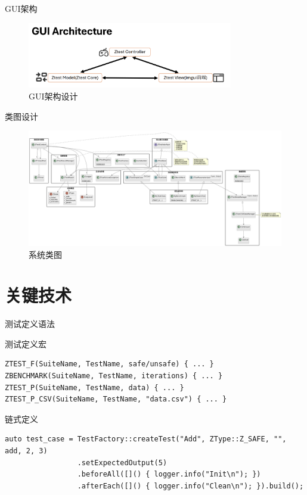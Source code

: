 \documentclass{beamer}
\begin{document}
\begin{frame}{GUI架构}
    \begin{figure}
        \centering
        \includegraphics[width=0.8\textwidth]{img/guiarch.png}
        \caption{GUI架构设计}
    \end{figure}
\end{frame}

\begin{frame}{类图设计}
    \begin{figure}
        \centering
        \includegraphics[width=\textwidth]{img/class.png}
        \caption{系统类图}
    \end{figure}
\end{frame}

\section{关键技术}
\begin{frame}{测试定义语法}
    \begin{block}{测试定义宏}
        \begin{lstlisting}[basicstyle=\ttfamily\small]
ZTEST_F(SuiteName, TestName, safe/unsafe) { ... }
ZBENCHMARK(SuiteName, TestName, iterations) { ... }
ZTEST_P(SuiteName, TestName, data) { ... }
ZTEST_P_CSV(SuiteName, TestName, "data.csv") { ... }
        \end{lstlisting}
    \end{block}

    \begin{block}{链式定义}
        \begin{lstlisting}[basicstyle=\ttfamily\small]
auto test_case = TestFactory::createTest("Add", ZType::Z_SAFE, "", add, 2, 3)
                 .setExpectedOutput(5)
                 .beforeAll([]() { logger.info("Init\n"); })          
                 .afterEach([]() { logger.info("Clean\n"); }).build();
        \end{lstlisting}
    \end{block}
\end{frame}
\end{document}
